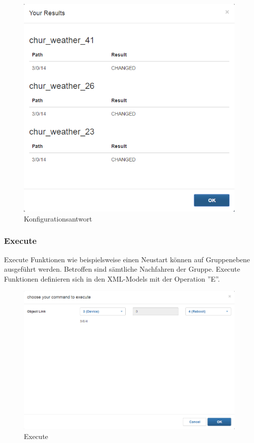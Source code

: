 \begin{figure}[H]
\centering
\includegraphics[scale=0.6]{../04_Realisierung/images/userinterface/configresults.png}
\caption{Konfigurationsantwort}
\end{figure}
\newpage

\subsubsection{Execute}
Execute Funktionen wie beispielsweise einen Neustart können auf Gruppenebene ausgeführt werden. Betroffen sind sämtliche Nachfahren der Gruppe. Execute Funktionen definieren sich in den XML-Models mit der Operation ''E''.

\begin{figure}[H]
\centering
\includegraphics[scale=0.6]{../04_Realisierung/images/userinterface/execute.png}
\caption{Execute}
\end{figure}

